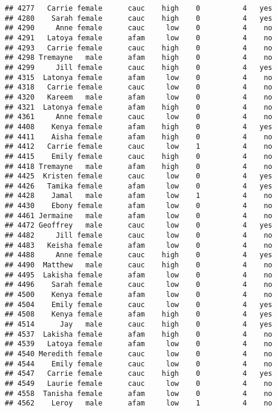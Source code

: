 \documentclass[
]{article}
\begin{document}
\begin{verbatim}
## 4277   Carrie female      cauc    high    0          4   yes
## 4280    Sarah female      cauc    high    0          4   yes
## 4290     Anne female      cauc     low    0          4    no
## 4291   Latoya female      afam     low    0          4    no
## 4293   Carrie female      cauc    high    0          4    no
## 4298 Tremayne   male      afam    high    0          4    no
## 4299     Jill female      cauc    high    0          4   yes
## 4315  Latonya female      afam     low    0          4    no
## 4318   Carrie female      cauc     low    0          4    no
## 4320   Kareem   male      afam     low    0          4    no
## 4321  Latonya female      afam    high    0          4    no
## 4361     Anne female      cauc     low    0          4    no
## 4408    Kenya female      afam    high    0          4   yes
## 4411    Aisha female      afam    high    0          4    no
## 4412   Carrie female      cauc     low    1          4    no
## 4415    Emily female      cauc    high    0          4    no
## 4418 Tremayne   male      afam    high    0          4    no
## 4425  Kristen female      cauc     low    0          4   yes
## 4426   Tamika female      afam     low    0          4   yes
## 4428    Jamal   male      afam     low    1          4    no
## 4430    Ebony female      afam     low    0          4    no
## 4461 Jermaine   male      afam     low    0          4    no
## 4472 Geoffrey   male      cauc     low    0          4   yes
## 4482     Jill female      cauc     low    0          4    no
## 4483   Keisha female      afam     low    0          4    no
## 4488     Anne female      cauc    high    0          4   yes
## 4490  Matthew   male      cauc    high    0          4    no
## 4495  Lakisha female      afam     low    0          4    no
## 4496    Sarah female      cauc     low    0          4    no
## 4500    Kenya female      afam     low    0          4    no
## 4504    Emily female      cauc     low    0          4   yes
## 4508    Kenya female      afam    high    0          4   yes
## 4514      Jay   male      cauc    high    0          4   yes
## 4537  Lakisha female      afam    high    0          4    no
## 4539   Latoya female      afam     low    0          4    no
## 4540 Meredith female      cauc     low    0          4    no
## 4544    Emily female      cauc     low    0          4    no
## 4547   Carrie female      cauc    high    0          4   yes
## 4549   Laurie female      cauc     low    0          4    no
## 4558  Tanisha female      afam     low    0          4    no
## 4562    Leroy   male      afam     low    1          4    no

\end{verbatim}
\end{document}
